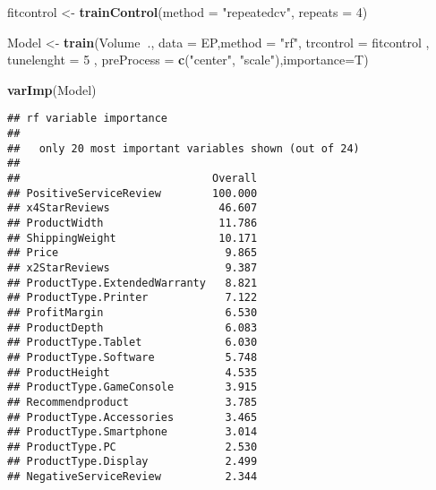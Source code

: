 \documentclass[]{article}
\newenvironment{Shaded}{\begin{snugshade}}{\end{snugshade}}
\newcommand{\KeywordTok}[1]{\textcolor[rgb]{0.13,0.29,0.53}{\textbf{#1}}}
\newcommand{\DataTypeTok}[1]{\textcolor[rgb]{0.13,0.29,0.53}{#1}}
\newcommand{\DecValTok}[1]{\textcolor[rgb]{0.00,0.00,0.81}{#1}}
\newcommand{\FloatTok}[1]{\textcolor[rgb]{0.00,0.00,0.81}{#1}}
\newcommand{\StringTok}[1]{\textcolor[rgb]{0.31,0.60,0.02}{#1}}
\newcommand{\OperatorTok}[1]{\textcolor[rgb]{0.81,0.36,0.00}{\textbf{#1}}}
\newcommand{\NormalTok}[1]{#1}
\begin{document}
\begin{Shaded}
\end{Shaded}

\begin{Shaded}
\begin{Highlighting}[]
\NormalTok{ fitcontrol <-}\StringTok{  }\KeywordTok{trainControl}\NormalTok{(}\DataTypeTok{method =} \StringTok{"repeatedcv"}\NormalTok{, }\DataTypeTok{repeats =} \DecValTok{4}\NormalTok{)}

\NormalTok{  Model <-}\StringTok{ }\KeywordTok{train}\NormalTok{(Volume}\OperatorTok{~}\NormalTok{., }\DataTypeTok{data =}\NormalTok{ EP,}\DataTypeTok{method =} \StringTok{"rf"}\NormalTok{, }\DataTypeTok{trcontrol =}\NormalTok{ fitcontrol , }\DataTypeTok{tunelenght =} \DecValTok{5}
\NormalTok{                 , }\DataTypeTok{preProcess =} \KeywordTok{c}\NormalTok{(}\StringTok{"center"}\NormalTok{, }\StringTok{"scale"}\NormalTok{),}\DataTypeTok{importance=}\NormalTok{T)  }
  
  \KeywordTok{varImp}\NormalTok{(Model)}
\end{Highlighting}
\end{Shaded}

\begin{verbatim}
## rf variable importance
## 
##   only 20 most important variables shown (out of 24)
## 
##                              Overall
## PositiveServiceReview        100.000
## x4StarReviews                 46.607
## ProductWidth                  11.786
## ShippingWeight                10.171
## Price                          9.865
## x2StarReviews                  9.387
## ProductType.ExtendedWarranty   8.821
## ProductType.Printer            7.122
## ProfitMargin                   6.530
## ProductDepth                   6.083
## ProductType.Tablet             6.030
## ProductType.Software           5.748
## ProductHeight                  4.535
## ProductType.GameConsole        3.915
## Recommendproduct               3.785
## ProductType.Accessories        3.465
## ProductType.Smartphone         3.014
## ProductType.PC                 2.530
## ProductType.Display            2.499
## NegativeServiceReview          2.344
\end{verbatim}
\end{document}
